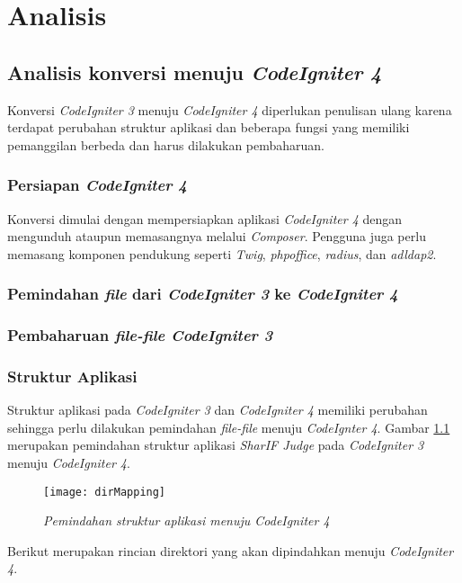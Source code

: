 \chapter{Analisis}
\label{chap:analisis}
\section{Analisis konversi menuju \textit{CodeIgniter 4}}
Konversi \textit{CodeIgniter 3} menuju \textit{CodeIgniter 4} diperlukan penulisan ulang karena terdapat perubahan struktur aplikasi dan beberapa fungsi yang memiliki pemanggilan berbeda dan harus dilakukan pembaharuan.
\subsection{Persiapan \textit{CodeIgniter 4}} Konversi dimulai dengan mempersiapkan aplikasi \textit{CodeIgniter 4} dengan mengunduh ataupun memasangnya melalui \textit{Composer}. Pengguna juga perlu memasang komponen pendukung seperti \textit{Twig}, \textit{phpoffice}, \textit{radius}, dan \textit{adldap2}.
\subsection{Pemindahan \textit{file} dari \textit{CodeIgniter 3} ke \textit{CodeIgniter 4}}


\subsection{Pembaharuan \textit{file-file CodeIgniter 3} }

\subsection{Struktur Aplikasi}
Struktur aplikasi pada \textit{CodeIgniter 3} dan \textit{CodeIgniter 4} memiliki perubahan sehingga perlu dilakukan pemindahan \textit{file-file} menuju \textit{CodeIgnter 4}. Gambar \ref{fig:dirMapping} merupakan pemindahan struktur aplikasi \textit{SharIF Judge} pada \textit{CodeIgniter 3} menuju \textit{CodeIgniter 4}.
\begin{figure}[H]
	\centering  
	\texttt{[image: dirMapping]}  
	\caption[\textit{Pemindahan struktur aplikasi menuju \textit{CodeIgniter 4}}]{\textit{Pemindahan struktur aplikasi menuju \textit{CodeIgniter 4}}} 
	\label{fig:dirMapping} 
\end{figure} 

Berikut merupakan rincian direktori yang akan dipindahkan menuju \textit{CodeIgniter 4}.
